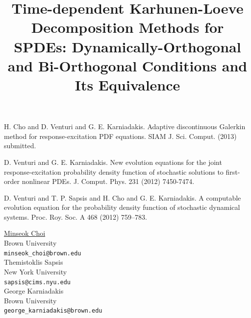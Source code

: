\documentclass[article,A4,11pt]{llncs}%
\begin{document}

\begin{thebibliography}{10}
{\sc H. Cho and D. Venturi and G. E. Karniadakis}. {Adaptive discontinuous Galerkin method for response-excitation PDF equations}. SIAM J. Sci. Comput. (2013) submitted.

{\sc D. Venturi and G. E. Karniadakis}. {New evolution equations for the joint response-excitation probability density function of stochastic solutions to first-order nonlinear PDEs}. J. Comput. Phys. 231 (2012) 7450-7474.

{\sc D. Venturi and T. P. Sapsis and H. Cho and G. E. Karniadakis}. {A computable evolution equation for the probability density function of stochastic dynamical systems}. Proc. Roy. Soc. A 468 (2012) 759–783.
\end{thebibliography}

\title{Time-dependent Karhunen-Loeve Decomposition Methods for SPDEs: Dynamically-Orthogonal and Bi-Orthogonal Conditions and Its Equivalence}
 \author{} \institute{}
\maketitle
\begin{center}
{\large \underline{Minseok Choi}}\\
Brown University\\
{\tt minseok\_choi@brown.edu}
\\ \vspace{4mm}
{\large Themistoklis Sapsis}\\
New York University\\
{\tt sapsis@cims.nyu.edu}
\\ \vspace{4mm}
{\large George Karniadakis}\\
Brown University\\
{\tt george\_karniadakis@brown.edu}
\end{center}
\end{document}
